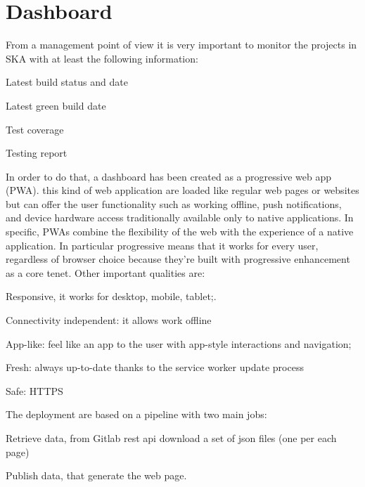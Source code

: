 \documentclass[a4paper,
               keeplastbox,   %
               ]{jacow}
\begin{document}
\section{Dashboard}
From a management point of view it is very important to monitor the projects in SKA with at least the following information: 
\begin{Itemize}
    \item Latest build status and date
    \item Latest green build date
    \item Test coverage
    \item Testing report
\end{Itemize}

In order to do that, a dashboard has been created as a progressive web app (PWA). this kind of web application are loaded like regular web pages or websites but can offer the user functionality such as working offline, push notifications, and device hardware access traditionally available only to native applications. In specific, PWAs combine the flexibility of the web with the experience of a native application. In particular progressive means that it works for every user, regardless of browser choice because they're built with progressive enhancement as a core tenet. Other important qualities are: 
\begin{Itemize}
    \item Responsive, it works for desktop, mobile, tablet;.
    \item Connectivity independent: it allows work offline
    \item App-like: feel like an app to the user with app-style interactions and navigation;
    \item Fresh: always up-to-date thanks to the service worker update process 
    \item Safe: HTTPS
\end{Itemize}

The deployment are based on a pipeline with two main jobs:
\begin{Itemize}
    \item Retrieve data, from Gitlab rest api download a set of json files (one per each page)
    \item Publish data, that generate the web page.
\end{Itemize}
\end{document}
